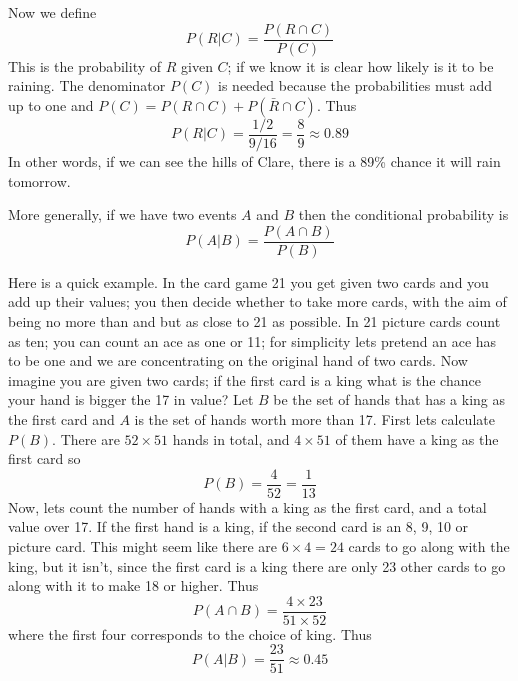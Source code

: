\documentclass[11pt,a4paper]{scrartcl}
\begin{document}
Now we define
\begin{equation}
P(R|C)=\frac{P(R\cap C)}{P(C)} 
\end{equation}
This is the probability of $R$ given $C$; if we know it is clear how
likely is it to be raining. The denominator $P(C)$ is needed because
the probabilities must add up to one and $P(C)=P(R\cap C)+P(\bar{R}\cap C)$. Thus
\begin{equation}
P(R|C)=\frac{1/2}{9/16}=\frac{8}{9}\approx  0.89
\end{equation}
In other words, if we can see the hills of Clare, there is a 89\%
chance it will rain tomorrow.

More generally, if we have two events $A$ and $B$ then the conditional probability is
\begin{equation}
P(A|B)=\frac{P(A\cap B)}{P(B)}
\end{equation}

Here is a quick example. In the card game 21 you get given two cards
and you add up their values; you then decide whether to take more
cards, with the aim of being no more than and but as close to 21 as
possible. In 21 picture cards count as ten; you can count an ace as
one or 11; for simplicity lets pretend an ace has to be one and we are
concentrating on the original hand of two cards. Now imagine you are
given two cards; if the first card is a king what is the chance your
hand is bigger the 17 in value? Let $B$ be the set of hands that has a
king as the first card and $A$ is the set of hands worth more than
17. First lets calculate $P(B)$. There are $52\times 51$ hands in
total, and $4\times 51$ of them have a king as the first card so
\begin{equation}
P(B)=\frac{4}{52}=\frac{1}{13}
\end{equation}
Now, lets count the number of hands with a king as the first card, and
a total value over 17. If the first hand is a king, if the second card
is an 8, 9, 10 or picture card. This might seem like there are
$6\times 4=24$ cards to go along with the king, but it isn't, since
the first card is a king there are only 23 other cards to go along
with it to make 18 or higher. Thus
\begin{equation}
P(A\cap B)=\frac{4\times 23}{51\times 52}
\end{equation}
where the first four corresponds to the choice of king. Thus
\begin{equation}
P(A|B)=\frac{23}{51}\approx 0.45
\end{equation}
\end{document}
